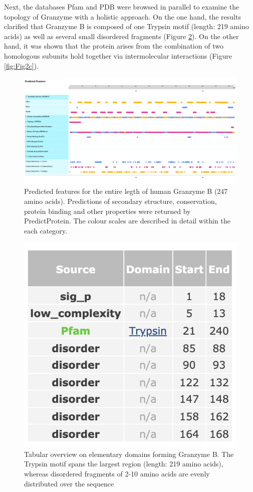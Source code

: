 \documentclass[
]{article}
\begin{document}
Next, the databases Pfam and PDB were browsed in parallel to examine the topology of Granzyme with a holistic approach. On the one hand, the results clarified that Granzyme B is composed of one Trypsin motif (length: 219 amino acids) as well as several small disordered fragments (Figure \ref{fig:Fig2b}). On the other hand, it was shown that the protein arises from the combination of two homologous subunits hold together via intermolecular interactions (Figure \ref{fig:Fig2c}).

\begin{figure}

{\centering \includegraphics[width=1\linewidth]{secondary structure prediction/predicted_features} 

}

\caption{Predicted features for the entire legth of human Granzyme B (247 amino acids). Predictions of secondary structure, conservation, protein binding and other properties were returned by PredictProtein. The colour scales are described in detail within the each category.}\label{fig:Fig2a}
\end{figure}

\begin{figure}

{\centering \includegraphics[width=0.3\linewidth]{motif analysis/pfam_table} 

}

\caption{Tabular overview on elementary domains forming Granzyme B. The Trypsin motif spans the largest region (length: 219 amino acids), whereas disordered fragments of 2-10 amino acids are evenly distributed over the sequence}\label{fig:Fig2b}
\end{figure}
\end{document}

